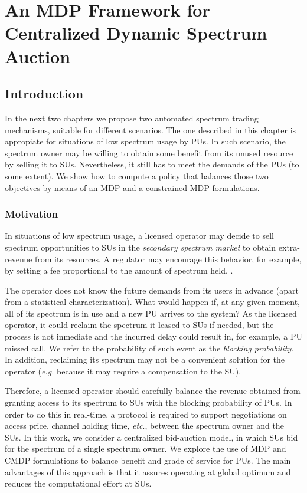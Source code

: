 \graphicspath{ {img/Sarnoff/} }
\chapter{An MDP Framework for Centralized Dynamic Spectrum Auction}\label{Sarnoff_chap}
\section{Introduction}
In the next two chapters we propose two automated spectrum trading mechanisms, suitable for different scenarios. The one described in this chapter is appropiate for situations of low spectrum usage by PUs. In such scenario, the spectrum owner may be willing to obtain some benefit from its unused resource by selling it to SUs. Nevertheless, it still has to meet the demands of the PUs (to some extent). We show how to compute a policy that balances those two objectives by means of an MDP and a constrained-MDP formulations. 

\subsection{Motivation}
In situations of low spectrum usage, a licensed operator may decide to sell spectrum opportunities to SUs in the \textit{secondary spectrum market} to obtain extra-revenue from its resources. A regulator may encourage this behavior, for example, by setting a fee proportional to the amount of spectrum held. \cite{AdvisorsonScience}.  

The operator does not know the future demands from its users in advance (apart from a statistical characterization). What would happen if, at any given moment, all of its spectrum is in use and a new PU arrives to the system? As the licensed operator, it could reclaim the spectrum it leased to SUs if needed, but the process is not inmediate and the incurred delay could result in, for example, a PU missed call. We refer to the probability of such event as the \emph{blocking probability}. In addition, reclaiming its spectrum may not be a convenient solution for the operator (\textit{e.g.} because it may require a compensation to the SU). 

Therefore, a licensed operator should carefully balance the revenue obtained from granting access to its spectrum to SUs with the blocking probability of PUs. In order to do this in real-time, a protocol is required to support negotiations on access price, channel holding time, \textit{etc}., between the spectrum owner and the SUs. In this work, we consider a centralized bid-auction model, in which SUs bid for the spectrum of a single spectrum owner. We explore the use of MDP and CMDP formulations to balance benefit and grade of service for PUs. The main advantages of this approach is that it assures operating at global optimum and reduces the computational effort at SUs.

